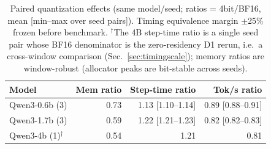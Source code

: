 \begin{table}[t]\centering
\caption{Paired quantization effects (same model/seed; ratios = 4bit/BF16, mean [min--max over seed pairs]). Timing equivalence margin $\pm$25\% frozen before benchmark. $^\dagger$The 4B step-time ratio is a single seed pair whose BF16 denominator is the zero-residency D1 rerun, i.e.\ a cross-window comparison (Sec.~\ref{sec:timingscale}); memory ratios are window-robust (allocator peaks are bit-stable across seeds).}
\label{tab:paired}
\footnotesize\setlength{\tabcolsep}{2.5pt}
\begin{tabular}{lrrr}
\toprule
Model & Mem ratio & Step-time ratio & Tok/s ratio\\
\midrule
Qwen3-0.6b (3) & 0.73 & 1.13 [1.10--1.14] & 0.89 [0.88--0.91]\\
Qwen3-1.7b (3) & 0.59 & 1.22 [1.21--1.23] & 0.82 [0.82--0.83]\\
Qwen3-4b (1)$^\dagger$ & 0.54 & 1.21 & 0.81\\
\bottomrule
\end{tabular}
\end{table}
